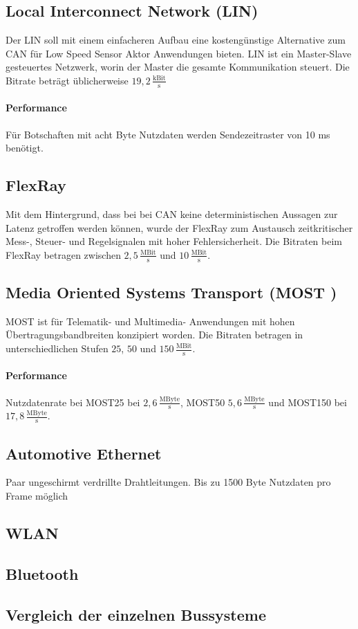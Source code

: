 \subsection{Local Interconnect Network (LIN)} 
Der LIN soll mit einem einfacheren Aufbau eine kostengünstige Alternative zum CAN für Low Speed Sensor Aktor Anwendungen bieten.
LIN ist ein Master-Slave gesteuertes Netzwerk, worin der Master die gesamte Kommunikation steuert. Die Bitrate beträgt üblicherweise $ 19,2\,\frac{\mathrm{kBit}}{\mathrm{s}} $
\cite[Vgl. Seite 79 ff.]{Zimmermann.2014}
\paragraph{Performance}
Für Botschaften mit acht Byte Nutzdaten werden Sendezeitraster von 10 ms benötigt. \cite[Vgl. Seite 94 f.]{Zimmermann.2014}
\subsection{FlexRay}
Mit dem Hintergrund, dass bei bei CAN keine deterministischen Aussagen zur Latenz getroffen werden können, wurde der FlexRay zum Austausch zeitkritischer Mess-, Steuer- und Regelsignalen mit hoher Fehlersicherheit. Die Bitraten beim FlexRay betragen zwischen $ 2,5\,\frac{\mathrm{MBit}}{\mathrm{s}} $ und $ 10\,\frac{\mathrm{MBit}}{\mathrm{s}} $.
\cite[Vgl. Seite 96 ff.]{Zimmermann.2014}
\subsection{Media Oriented Systems Transport (MOST )}
MOST ist für Telematik- und Multimedia- Anwendungen mit hohen Übertragungsbandbreiten konzipiert worden.
Die Bitraten betragen in unterschiedlichen Stufen $ 25 $, $ 50 $ und $ 150\,\frac{\mathrm{MBit}}{\mathrm{s}} $.
\paragraph{Performance}
Nutzdatenrate bei MOST25 bei $ 2,6\,\frac{\mathrm{MByte}}{\mathrm{s}} $, MOST50 $ 5,6\,\frac{\mathrm{MByte}}{\mathrm{s}} $  und MOST150 bei $ 17,8\,\frac{\mathrm{MByte}}{\mathrm{s}} $.

\cite[Vgl. Seite 119 ff.]{Zimmermann.2014}
\subsection{Automotive Ethernet}
Paar ungeschirmt verdrillte Drahtleitungen.
Bis zu 1500 Byte Nutzdaten pro Frame möglich
\cite[Vgl. Seite 138 ff.]{Zimmermann.2014}
\subsection{WLAN}

\subsection{Bluetooth}
\subsection{Vergleich der einzelnen Bussysteme}